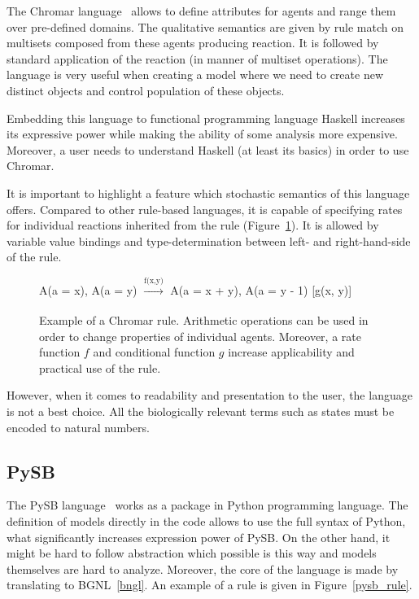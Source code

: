 \documentclass[12pt]{fithesis2}
\begin{document}
The Chromar language~\cite{honorato2017chromar} allows to define attributes for agents and range them over pre-defined domains. The qualitative semantics are given by rule match on multisets composed from these agents producing reaction. It is followed by standard application of the reaction (in manner of multiset operations). The language is very useful when creating a model where we need to create new distinct objects and control population of these objects.

Embedding this language to functional programming language Haskell increases its expressive power while making the ability of some analysis more expensive. Moreover, a user needs to understand Haskell (at least its basics) in order to use Chromar.

It is important to highlight a feature which stochastic semantics of this language offers. Compared to other rule-based languages, it is capable of specifying rates for individual reactions inherited from the rule (Figure~\ref{chromar_rule}). It is allowed by variable value bindings and type-determination between left- and right-hand-side of the rule.

\begin{figure}[!h]
\begin{center}
A(a = x), A(a = y) $\xrightarrow[]{\text{f(x,y)}}$ A(a = x + y), A(a = y - 1) [g(x, y)]
\end{center}
\caption{Example of a Chromar rule. Arithmetic operations can be used in order to change properties of individual agents. Moreover, a rate function $f$ and conditional function $g$ increase applicability and practical use of the rule.}\label{chromar-rule}\label{chromar_rule}
\end{figure}

However, when it comes to readability and presentation to the user, the language is not a best choice. All the biologically relevant terms such as states must be encoded to natural numbers.

\subsection{PySB}

The PySB language~\cite{Lopez646} works as a package in Python programming language. The definition of models directly in the code allows to use the full syntax of Python, what significantly increases expression power of PySB. On the other hand, it might be hard to follow abstraction which possible is this way and models themselves are hard to analyze. Moreover, the core of the language is made by translating to BGNL~\ref{bngl}. An example of a rule is given in Figure~\ref{pysb_rule}.
\end{document}
